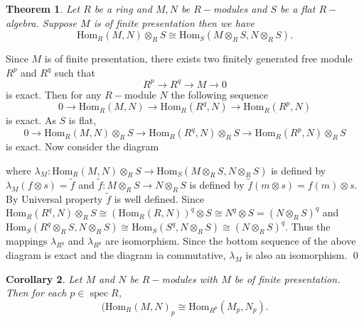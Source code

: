 \documentclass[11pt]{amsart}
\newtheorem{theorem}{Theorem}[section]
\newtheorem{corollary}[theorem]{Corollary}%
\newcommand{\Hom}[1]{\text{Hom}_R\left(#1\right)}
\newcommand{\Homs}[1]{\text{Hom}_S\left(#1\right)}
\DeclareMathOperator{\spec}{\text{spec}}
\begin{document}
\begin{theorem}

Let $R$ be a ring and $M, N$ be $R-$modules and $S$ be a flat $R-$algebra. Suppose $M$ is of finite presentation then we have $$\Hom{M,N}\otimes_R S\cong \Homs{M\otimes_R S, N\otimes_R S}.$$

\end{theorem}

\proof Since $M$ is of finite presentation, there exists two finitely generated free module $R^p$ and $R^q$ such that \begin{equation}
R^p\to R^q\to M\to 0 
\end{equation}
is exact. Then for any $R-$module $N$ the following sequence \begin{equation}
0\to \Hom{M,N}\to \Hom{R^q,N}\to \Hom{R^p,N}
\end{equation}
is exact. As $S$ is flat, $$0\to \Hom{M,N}\otimes_R S\to \Hom{R^q,N}\otimes_R S\to \Hom{R^p,N}\otimes_R S$$ is exact. Now consider the diagram 

\begin{center}


\end{center}

where $\lambda_M: \Hom{M,N}\otimes_R S\to \Homs{M\otimes_R S,N\otimes_R S}$ is defined by $\lambda_M(f\otimes s)=\tilde{f}$ and $\tilde{f}:M\otimes_R S\to N\otimes_R S$ is defined by $\tilde{f}(m\otimes s)=f(m)\otimes s.$ By Universal property $\tilde{f}$ is well defined. Since $\Hom{R^q,N}\otimes_R S\cong (\Hom{R,N})^q\otimes S\cong N^q\otimes S=(N\otimes_R S)^q$ and $\Homs{R^q\otimes_R S,N\otimes_R S}\cong\Homs{S^q,N\otimes_R S}\cong (N\otimes_R S)^q.$ Thus the mappings $\lambda_{R^q}$ and $\lambda_{R^p}$ are isomorphism. Since the bottom sequence of the above diagram is exact and the diagram ia commutative, $\lambda_M$ is also an isomorphism. \qed

\begin{corollary}

Let $M$ and $N$ be $R-$modules with $M$ be of finite presentation. Then for each $p\in\spec R$, $$(\Hom{M,N}_p\cong \text{Hom}_{R^p}(M_p,N_p).$$

\end{corollary}
\end{document}
